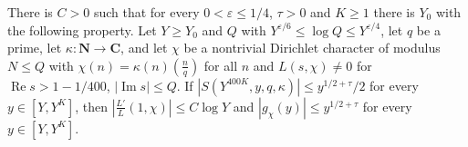 \begin{lemma}\label{hf-chebyshev-from-twisted-sum}
There is $C>0$ such that for every $0<\varepsilon\leq1/4$, $\tau>0$ and $K\geq1$ there is $Y_0$ with
the following property. Let $Y\geq Y_0$ and $Q$ with $Y^{\varepsilon/6}\leq\log Q\leq
Y^{\varepsilon/4}$, let $q$ be a prime, let $\kappa\colon\mathbf N\to\mathbf C$, and let $\chi$ be a
nontrivial Dirichlet character of modulus $N\leq Q$ with $\chi(n)=\kappa(n)\left(\frac nq\right)$
for all $n$ and $L(s,\chi)\neq0$ for $\operatorname{Re}s>1-1/400$, $|\operatorname{Im}s|\leq Q$.
If $|S(Y^{400K},y,q,\kappa)|\leq y^{1/2+\tau}/2$ for every $y\in[Y,Y^K]$, then
$\left|\frac{L'}{L}(1,\chi)\right|\leq C\log Y$ and $|g_\chi(y)|\leq y^{1/2+\tau}$ for every
$y\in[Y,Y^K]$.
\end{lemma}

